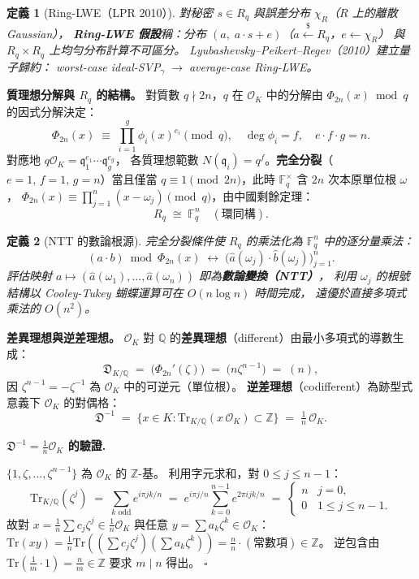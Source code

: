 \documentclass[10.5pt, a4paper]{article}
\theoremstyle{cpt}
\newtheorem{definition}{定義}
\newenvironment{proofbox}[1][證明]{%
  \begin{tcolorbox}[colback=thmfill, colframe=accent!40,
    breakable, left=5pt, right=5pt, top=3pt, bottom=3pt, boxrule=0.4pt]
  \noindent\textbf{\color{accent}#1.}\quad\small
}{%
  \hfill$\square$\end{tcolorbox}\vspace{-1pt}
}
\begin{document}
\begin{definition}[Ring-LWE（LPR 2010）]
  對秘密 $s\in R_q$ 與誤差分布 $\chi_R$（$R$ 上的離散 Gaussian），
  \textbf{Ring-LWE 假設}稱：分布
  $(a,\;a\cdot s+e)$（$a\overset{\$}{\leftarrow}R_q$，$e\leftarrow\chi_R$）
  與 $R_q\times R_q$ 上均勻分布計算不可區分。
  Lyubashevsky--Peikert--Regev（2010）建立量子歸約：
  worst-case ideal-SVP$_\gamma\;\to\;$average-case Ring-LWE。
\end{definition}

\textbf{質理想分解與 $R_q$ 的結構。}
對質數 $q\nmid 2n$，$q$ 在 $\mathcal{O}_K$ 中的分解由 $\Phi_{2n}(x)\bmod q$ 的因式分解決定：
\[
  \Phi_{2n}(x)\;\equiv\;\prod_{i=1}^{g}\phi_i(x)^{e_i}\pmod{q},\quad
  \deg\phi_i=f,\quad e\cdot f\cdot g=n.
\]
對應地 $q\mathcal{O}_K=\mathfrak{q}_1^{e_1}\cdots\mathfrak{q}_g^{e_g}$，
各質理想範數 $N(\mathfrak{q}_i)=q^f$。\textbf{完全分裂}（$e=1,\,f=1,\,g=n$）當且僅當
$q\equiv 1\pmod{2n}$，此時 $\mathbb{F}_q^\times$ 含 $2n$ 次本原單位根 $\omega$，
$\Phi_{2n}(x)\equiv\prod_{j=1}^n(x-\omega_j)\pmod{q}$，由中國剩餘定理：
\[
  R_q\;\cong\;\mathbb{F}_q^n\quad(\text{環同構}).
\]

\begin{definition}[NTT 的數論根源]
  完全分裂條件使 $R_q$ 的乘法化為 $\mathbb{F}_q^n$ 中的逐分量乘法：
  \[
    (a\cdot b)\bmod\Phi_{2n}(x)
    \;\longleftrightarrow\;
    \bigl(\hat{a}(\omega_j)\cdot\hat{b}(\omega_j)\bigr)_{j=1}^n.
  \]
  評估映射 $a\mapsto(\hat{a}(\omega_1),\ldots,\hat{a}(\omega_n))$ 即為\textbf{數論變換（NTT）}，
  利用 $\omega_j$ 的根號結構以 Cooley-Tukey 蝴蝶運算可在 $O(n\log n)$ 時間完成，
  遠優於直接多項式乘法的 $O(n^2)$。
\end{definition}

\textbf{差異理想與逆差理想。}
$\mathcal{O}_K$ 對 $\mathbb{Q}$ 的\textbf{差異理想}（different）由最小多項式的導數生成：
\[
  \mathfrak{D}_{K/\mathbb{Q}}\;=\;\bigl(\Phi_{2n}'(\zeta)\bigr)
  \;=\;\bigl(n\zeta^{n-1}\bigr)
  \;=\;(n),
\]
因 $\zeta^{n-1}=-\zeta^{-1}$ 為 $\mathcal{O}_K$ 中的可逆元（單位根）。
\textbf{逆差理想}（codifferent）為跡型式意義下 $\mathcal{O}_K$ 的對偶格：
\[
  \mathfrak{D}^{-1}
  \;=\;\bigl\{x\in K:\mathrm{Tr}_{K/\mathbb{Q}}(x\,\mathcal{O}_K)\subset\mathbb{Z}\bigr\}
  \;=\;\tfrac{1}{n}\,\mathcal{O}_K.
\]

\begin{proofbox}[$\mathfrak{D}^{-1}=\tfrac{1}{n}\mathcal{O}_K$ 的驗證]
  $\{1,\zeta,\ldots,\zeta^{n-1}\}$ 為 $\mathcal{O}_K$ 的 $\mathbb{Z}$-基。
  利用字元求和，對 $0\le j\le n-1$：
  \[
    \mathrm{Tr}_{K/\mathbb{Q}}(\zeta^j)
    \;=\;\sum_{k\text{ odd}}e^{i\pi jk/n}
    \;=\;e^{i\pi j/n}\sum_{k=0}^{n-1}e^{2\pi ijk/n}
    \;=\;\begin{cases}n&j=0,\\0&1\le j\le n-1.\end{cases}
  \]
  故對 $x=\frac{1}{n}\sum c_j\zeta^j\in\frac{1}{n}\mathcal{O}_K$ 與任意
  $y=\sum a_k\zeta^k\in\mathcal{O}_K$：
  $\mathrm{Tr}(xy)=\frac{1}{n}\mathrm{Tr}((\sum c_j\zeta^j)(\sum a_k\zeta^k))=\frac{n}{n}\cdot(\text{常數項})\in\mathbb{Z}$。
  逆包含由 $\mathrm{Tr}(\frac{1}{m}\cdot 1)=\frac{n}{m}\in\mathbb{Z}$ 要求 $m\mid n$ 得出。
\end{proofbox}
\end{document}
